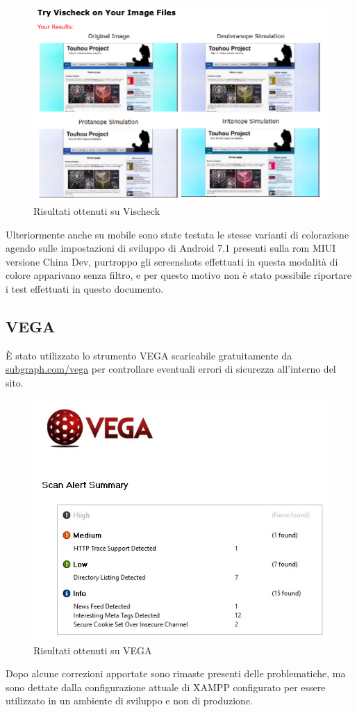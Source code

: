 \documentclass[openany, a4paper, 12pt]{report}
\begin{document}
			\begin{figure}[H]
				\centering
				\includegraphics[width=0.8\linewidth]{images/daltonismo}
				\caption{Risultati ottenuti su Vischeck}
			\end{figure}
			Ulteriormente anche su mobile sono state testata le stesse varianti di colorazione agendo sulle impostazioni di sviluppo di Android 7.1 presenti sulla rom MIUI versione China Dev, purtroppo gli screenshots effettuati in questa modalità di colore apparivano senza filtro, e per questo motivo non è stato possibile riportare i test effettuati in questo documento.
			
			\subsection{VEGA}
			\`{E} stato utilizzato lo strumento VEGA scaricabile gratuitamente da \url{subgraph.com/vega} per controllare eventuali errori di sicurezza all'interno del sito.\\
			
			\begin{figure}[H]
				\centering
				\includegraphics[width=0.8\linewidth]{images/VEGA}
				\caption{Risultati ottenuti su VEGA}
			\end{figure}
			Dopo alcune correzioni apportate sono rimaste presenti delle problematiche, ma sono dettate dalla configurazione attuale di XAMPP configurato per essere utilizzato in un ambiente di sviluppo e non di produzione.
\end{document}
